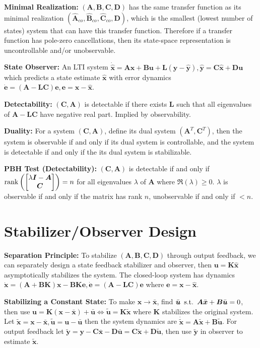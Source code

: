 \documentclass[twocolumn, 8pt]{extarticle}
\begin{document}
\textbf{Minimal Realization:} \((\bm A, \bm B, \bm C, \bm D)\) has the same transfer function as its minimal realization
\((\hat{\bm A}_{co}, \hat{\bm B}_{co}, \hat{\bm C}_{co}, \bm D)\), which is the smallest (lowest number of states) system
that can have this transfer function.
Therefore if a transfer function has pole-zero cancellations, then its state-space representation is uncontrollable
and/or unobservable.

\textbf{State Observer:} An LTI system \(\dot{\hat{\bm x}} = \bm A\hat{\bm x} + \bm B\bm u + \bm L(\bm y - \hat{\bm y}), \hat{\bm y} = \bm C\hat{\bm x} + \bm D\bm u\) \\
which predicts a state estimate \(\hat{\bm x}\) with error dynamics \(\dot{\bm e} = (\bm A - \bm L\bm C)\bm e, \bm e = \bm x - \hat{\bm x}\).

\textbf{Detectability:} \((\bm C, \bm A)\) is detectable if there exists \(\bm L\) such that all eigenvalues of
\(\bm A - \bm L\bm C\) have negative real part. Implied by observability.

\textbf{Duality:} For a system \((\bm C, \bm A)\), define its dual system \((\bm A^T, \bm C^T)\), then the system is
observable if and only if its dual system is controllable, and the system is detectable if and only if the its dual
system is stabilizable.

\textbf{PBH Test (Detectability):} \((\bm C, \bm A)\) is detectable if and only if
\(\rank\left(\cvec{\lambda\bm I - \bm A}{\bm C}\right) = n\) for all eigenvalues \(\lambda\) of \(\bm A\) where
\(\Re(\lambda) \geq 0\). \(\lambda\) is observable if and only if the matrix has rank \(n\), unobservable if and only if \(< n\).


\section{Stabilizer/Observer Design}

\textbf{Separation Principle:} To stabilize \((\bm A, \bm B, \bm C, \bm D)\) through output feedback, we can separately
design a state feedback stabilizer and observer, then \(\bm u = \bm K\hat{\bm x}\) asymptotically stabilizes the system.
The closed-loop system has dynamics \(\dot{\bm x} = (\bm A + \bm B\bm K)\bm x - \bm B\bm K\bm e, \dot{\bm e} = (\bm A -
\bm L\bm C)\bm e\) where \(\bm e = \bm x - \hat{\bm x}\).

\textbf{Stabilizing a Constant State:} To make \(\bm x \to \bar{\bm x}\), find \(\bar{\bm u} \enspace\mathrm{s.t.}\enspace \bm A\bar{\bm x}
+ \bm B\bar{\bm u} = 0\), then use \(\bm u = \bm K(\bm x - \bar{\bm x}) + \bar{\bm u} \iff \tilde{\bm u} = \bm
K\tilde{\bm x}\) where \(\bm K\) stabilizes the original system. Let \(\tilde{\bm x} = \bm x - \bar{\bm x}, \tilde{\bm
u} = \bm u - \bar{\bm u}\) then the system dynamics are \(\dot{\tilde{\bm x}} = \bm A\tilde{\bm x} + \bm B\tilde{\bm
u}\). For output feedback let \(\tilde{\bm y} = \bm y - \bm C\bar{\bm x} - \bm D\bar{\bm u} = \bm C\tilde{\bm x} + \bm
D\tilde{\bm u}\), then use \(\tilde{\bm y}\) in observer to estimate \(\tilde{\bm x}\).
\end{document}
